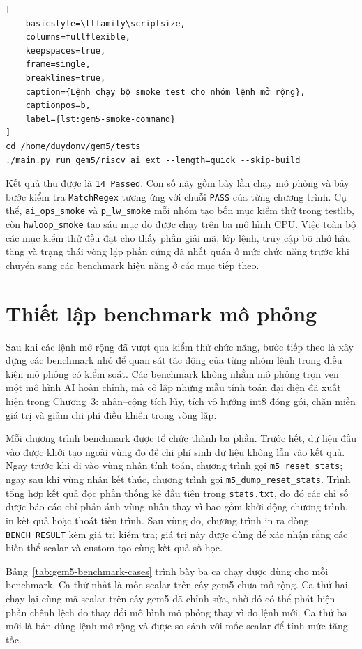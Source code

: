 \documentclass[../DoAn.tex]{subfiles}
\begin{document}
\begin{lstlisting}[
    basicstyle=\ttfamily\scriptsize,
    columns=fullflexible,
    keepspaces=true,
    frame=single,
    breaklines=true,
    caption={Lệnh chạy bộ smoke test cho nhóm lệnh mở rộng},
    captionpos=b,
    label={lst:gem5-smoke-command}
]
cd /home/duydonv/gem5/tests
./main.py run gem5/riscv_ai_ext --length=quick --skip-build
\end{lstlisting}

Kết quả thu được là \texttt{14 Passed}. Con số này gồm bảy lần chạy mô phỏng và bảy bước kiểm tra \texttt{MatchRegex} tương ứng với chuỗi \texttt{PASS} của từng chương trình. Cụ thể, \texttt{ai\_ops\_smoke} và \texttt{p\_lw\_smoke} mỗi nhóm tạo bốn mục kiểm thử trong testlib, còn \texttt{hwloop\_smoke} tạo sáu mục do được chạy trên ba mô hình CPU. Việc toàn bộ các mục kiểm thử đều đạt cho thấy phần giải mã, lớp lệnh, truy cập bộ nhớ hậu tăng và trạng thái vòng lặp phần cứng đã nhất quán ở mức chức năng trước khi chuyển sang các benchmark hiệu năng ở các mục tiếp theo.

\section{Thiết lập benchmark mô phỏng}
\label{sec:thiet-lap-benchmark-gem5}

Sau khi các lệnh mở rộng đã vượt qua kiểm thử chức năng, bước tiếp theo là xây dựng các benchmark nhỏ để quan sát tác động của từng nhóm lệnh trong điều kiện mô phỏng có kiểm soát. Các benchmark không nhằm mô phỏng trọn vẹn một mô hình AI hoàn chỉnh, mà cô lập những mẫu tính toán đại diện đã xuất hiện trong Chương~3: nhân--cộng tích lũy, tích vô hướng int8 đóng gói, chặn miền giá trị và giảm chi phí điều khiển trong vòng lặp.

Mỗi chương trình benchmark được tổ chức thành ba phần. Trước hết, dữ liệu đầu vào được khởi tạo ngoài vùng đo để chi phí sinh dữ liệu không lẫn vào kết quả. Ngay trước khi đi vào vùng nhân tính toán, chương trình gọi \texttt{m5\_reset\_stats}; ngay sau khi vùng nhân kết thúc, chương trình gọi \texttt{m5\_dump\_reset\_stats}. Trình tổng hợp kết quả đọc phần thống kê đầu tiên trong \texttt{stats.txt}, do đó các chỉ số được báo cáo chỉ phản ánh vùng nhân thay vì bao gồm khởi động chương trình, in kết quả hoặc thoát tiến trình. Sau vùng đo, chương trình in ra dòng \texttt{BENCH\_RESULT} kèm giá trị kiểm tra; giá trị này được dùng để xác nhận rằng các biến thể scalar và custom tạo cùng kết quả số học.

Bảng~\ref{tab:gem5-benchmark-cases} trình bày ba ca chạy được dùng cho mỗi benchmark. Ca thứ nhất là mốc scalar trên cây gem5 chưa mở rộng. Ca thứ hai chạy lại cùng mã scalar trên cây gem5 đã chỉnh sửa, nhờ đó có thể phát hiện phần chênh lệch do thay đổi mô hình mô phỏng thay vì do lệnh mới. Ca thứ ba mới là bản dùng lệnh mở rộng và được so sánh với mốc scalar để tính mức tăng tốc.
\end{document}
